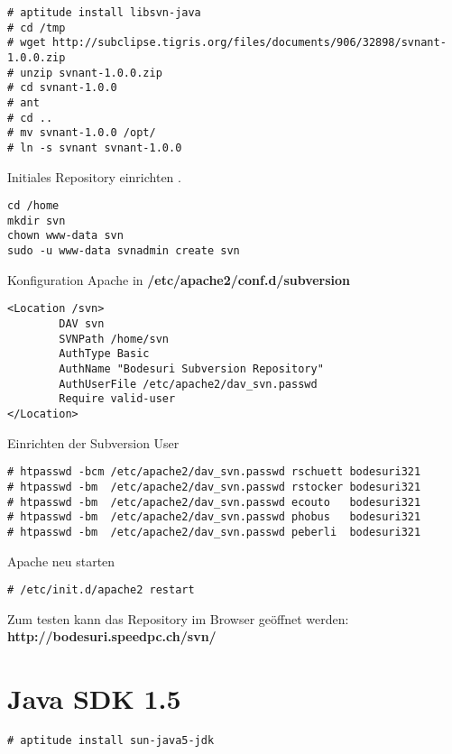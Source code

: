\documentclass[a4paper,12pt,halfparskip,DIV14]{scrreprt}
\begin{document}
\begin{verbatim}
# aptitude install libsvn-java
# cd /tmp
# wget http://subclipse.tigris.org/files/documents/906/32898/svnant-1.0.0.zip
# unzip svnant-1.0.0.zip
# cd svnant-1.0.0
# ant
# cd ..
# mv svnant-1.0.0 /opt/
# ln -s svnant svnant-1.0.0
\end{verbatim}

Initiales Repository einrichten .

\begin{verbatim}
cd /home
mkdir svn
chown www-data svn
sudo -u www-data svnadmin create svn
\end{verbatim}

Konfiguration Apache in \textbf{/etc/apache2/conf.d/subversion}

\begin{verbatim}
<Location /svn>
        DAV svn
        SVNPath /home/svn
        AuthType Basic
        AuthName "Bodesuri Subversion Repository"
        AuthUserFile /etc/apache2/dav_svn.passwd
        Require valid-user
</Location>
\end{verbatim}

Einrichten der Subversion User

\begin{verbatim}
# htpasswd -bcm /etc/apache2/dav_svn.passwd rschuett bodesuri321
# htpasswd -bm  /etc/apache2/dav_svn.passwd rstocker bodesuri321
# htpasswd -bm  /etc/apache2/dav_svn.passwd ecouto   bodesuri321
# htpasswd -bm  /etc/apache2/dav_svn.passwd phobus   bodesuri321
# htpasswd -bm  /etc/apache2/dav_svn.passwd peberli  bodesuri321
\end{verbatim}

Apache neu starten

\begin{verbatim}
# /etc/init.d/apache2 restart
\end{verbatim}

Zum testen kann das Repository im Browser geöffnet werden: \textbf{http://bodesuri.speedpc.ch/svn/} 



\section{Java SDK 1.5} %
\label{sec:java_sdk_1_5}

\begin{verbatim}
# aptitude install sun-java5-jdk
\end{verbatim}
\end{document}
